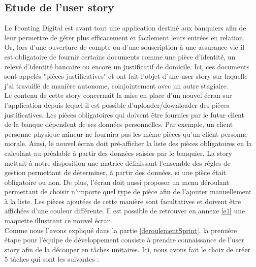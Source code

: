 \subsection{Etude de l'user story}

	Le Fronting Digital est avant tout une application destiné aux banquiers afin de leur permettre de gérer plus efficacement et facilement leurs entrées en relation. Or, lors d'une ouverture de compte ou d'une souscription à une assurance vie il est obligatoire de fournir certains documents comme une pièce d'identité, un relevé d'identité bancaire ou encore un justificatif de domicile. Ici, ces documents sont appelés "pièces justificatives" et ont fait l'objet d'une user story sur laquelle j'ai travaillé de manière autonome, coinjointement avec un autre stagiaire. \\
	
	Le contenu de cette story concernait la mise en place d'un nouvel écran sur l'application depuis lequel il est possible d'uploader/downloader des pièces justificatives. Les pièces obligatoires qui doivent être fournies par le futur client de la banque dépendent de ses données personnelles. Par exemple, un client personne physique mineur ne fournira pas les même pièces qu'un client personne morale. Ainsi, le nouvel écran doit pré-afficher la liste des pièces obligatoires en la calculant au préalable à partir des données saisies par le banquier. La story mettait à notre disposition une matrice définissant l'ensemble des règles de gestion permettant de déterminer, à partir des données, si une pièce était obligatoire ou non. De plus, l'écran doit aussi proposer un menu déroulant permettant de choisir n'importe quel type de pièce afin de l'ajouter manuellement à la liste. Les pièces ajoutées de cette manière sont facultatives et doivent être affichées d'une couleur différente. Il est possible de retrouver en annexe \ref{e1} une maquette illustrant ce nouvel écran. \\

	Comme nous l'avons expliqué dans la partie \ref{deroulementSprint}, la première étape pour l'équipe de développement consiste à prendre connaissance de l'user story afin de la découper en tâches unitaires. Ici, nous avons fait le choix de créer 5 tâches qui sont les suivantes :
	
